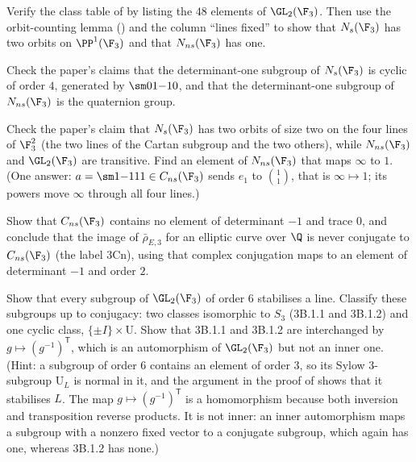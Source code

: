 \begin{exercise}\label{ex:groups:ex5}
Verify the class table of  by listing the $48$ elements of $\GL_2(\F_3)$. Then use the orbit-counting lemma
() and the column ``lines fixed'' to show that $N_s(\F_3)$ has two orbits on $\PP^1(\F_3)$ and that $N_{ns}(\F_3)$ has one.
\end{exercise}

\begin{exercise}\label{ex:groups:ex6}
Check the paper's claims that the determinant-one subgroup of $N_s(\F_3)$ is cyclic of order $4$, generated by $\sm01{-1}0$, and that the determinant-one subgroup of
$N_{ns}(\F_3)$ is the quaternion group.
\end{exercise}

\begin{exercise}\label{ex:groups:ex7}
Check the paper's claim that $N_s(\F_3)$ has two orbits of size two on the four lines of $\F_3^2$ (the two lines of the Cartan subgroup and the two others), while
$N_{ns}(\F_3)$ and $\GL_2(\F_3)$ are transitive. Find an element of $N_{ns}(\F_3)$ that maps $\infty$ to $1$.
(One answer: $a=\sm1{-1}11\in C_{ns}(\F_3)$ sends $e_1$ to $\binom11$, that is $\infty\mapsto1$; its powers move $\infty$ through all four lines.)
\end{exercise}

\begin{exercise}\label{ex:groups:ex8}
Show that $C_{ns}(\F_3)$ contains no element of determinant $-1$ and trace $0$, and conclude that the image of $\bar\rho_{E,3}$ for an elliptic curve over $\Q$ is never
conjugate to $C_{ns}(\F_3)$ (the label 3Cn), using that complex conjugation maps to an element of determinant $-1$ and order $2$.
\end{exercise}

\begin{exercise}\label{ex:groups:ex9}
Show that every subgroup of $\GL_2(\F_3)$ of order $6$ stabilises a line. Classify these subgroups up to conjugacy: two classes isomorphic to $S_3$ (3B.1.1 and 3B.1.2)
and one cyclic class, $\{\pm I\}\times\mathrm U$. Show that 3B.1.1 and 3B.1.2 are interchanged by $g\mapsto(g^{-1})^{\mathsf T}$, which is an automorphism of $\GL_2(\F_3)$ but not an
inner one.
(Hint: a subgroup of order $6$ contains an element of order $3$, so its Sylow $3$-subgroup $\mathrm U_L$ is normal in it, and the argument in the proof of
 shows that it stabilises $L$. The map $g\mapsto(g^{-1})^{\mathsf T}$ is a homomorphism because both inversion and transposition reverse
products. It is not inner: an inner automorphism maps a subgroup with a nonzero fixed vector to a conjugate subgroup, which again has one, whereas 3B.1.2 has none.)
\end{exercise}

